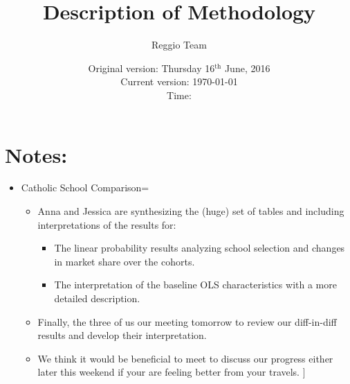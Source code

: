 \documentclass[10pt]{article}
\begin{document}
\title{Description of Methodology}
\author{Reggio Team}
\date{Original version: Thursday  16$^{\text{th}}$ June, 2016 \\ Current version: \today \\ \vspace{1em} Time: \currenttime}
\maketitle

\doublespacing

\section*{Notes:}

\begin{itemize}

\item Catholic School Comparison=
\begin{itemize}
Sylvi has located a detailed secription of catholic preschool and other parocial schools in Italy as well as contacted Notre Dame. A (no more than 3 paragraph) description of this document is due to me tomorrow.
\begin{itemize}
\item Daniel (her summer assistant) is preparing 3 tables detailing these differences. These are also due to me tomorrow.
\end{itemize}
\item Anna and Jessica are synthesizing the (huge) set of tables and including interpretations of the results for:
\begin{itemize}
\item The linear probability results analyzing school selection and changes in market share over the cohorts.
\item The interpretation of the baseline OLS characteristics with a more detailed description.
\end{itemize}
\item Finally, the three of us our meeting tomorrow to review our diff-in-diff results and develop their interpretation.
\item We think it would be beneficial to meet to discuss our progress either later this weekend if your are feeling better from your travels. 
]\end{itemize}
\end{itemize}
\end{document}
